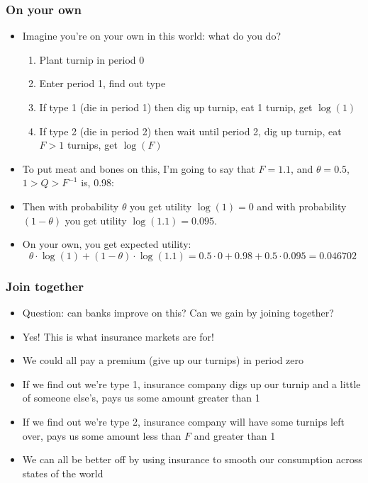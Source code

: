 \documentclass{beamer}
\begin{document}
\begin{frame}
\frametitle{On your own}
\begin{itemize}
\item<1-> Imagine you're on your own in this world: what do you do?
\bigskip
\begin{enumerate}
\item<2-> Plant turnip in period 0
\bigskip
\item<3-> Enter period 1, find out type
\bigskip
\item<4-> If type 1 (die in period 1) then dig up turnip, eat 1 turnip, get $\log(1)$
\bigskip
\item<5-> If type 2 (die in period 2) then wait until period 2, dig up turnip, eat $F>1$ turnips, get $\log(F)$
\end{enumerate}
\item<7-> To put meat and bones on this, I'm going to say that $F=1.1$, and $\theta=0.5$, $1>Q>F^{-1}$ is, 0.98:
\bigskip
\item<8-> Then with probability $\theta$ you get utility $\log(1)=0$ and with probability $(1-\theta)$ you get utility $\log(1.1)=0.095$.  
\bigskip
\item<9-> On your own, you get expected utility:
$$\theta\cdot \log(1)+(1-\theta)\cdot\log(1.1)=0.5\cdot0+0.98 +0.5\cdot 0.095=0.046702$$
\end{itemize}
\end{frame}

\begin{frame}
\frametitle{Join together}
\begin{itemize}
\item<1-> Question:  can banks improve on this?  Can we gain by joining together?
\bigskip
\item<2-> Yes!  This is what insurance markets are for!
\bigskip
\item<3-> We could all pay a premium (give up our turnips) in period zero
\bigskip
\item<4-> If we find out we're type 1, insurance company digs up our turnip and a little of someone else's, pays us some amount greater than 1
\bigskip
\item<5-> If we find out we're type 2, insurance company will have some turnips left over, pays us some amount less than $F$ and greater than 1
\bigskip
\item<6-> We can all be better off by using insurance to smooth our consumption across states of the world
\end{itemize}
\end{frame}
\end{document}
